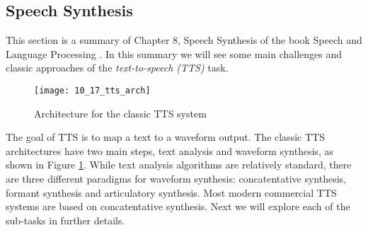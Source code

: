 \subsection{Speech Synthesis \cite{Jurafsky2006}}

This section is a summary of Chapter 8, Speech Synthesis of the book Speech and Language Processing \cite{Jurafsky2006}. In this summary we will see some main challenges and classic approaches of the \emph{text-to-speech (TTS)} task.

\begin{figure}[htbp]
  \centering
  \texttt{[image: 10\_17\_tts\_arch]}\\
  \caption{Architecture for the classic TTS system}\label{fig:TTS_arch}
\end{figure}

The goal of TTS is to map a text to a waveform output. The classic TTS architectures have two main steps, text analysis and waveform synthesis, as shown in Figure \ref{fig:TTS_arch}. While text analysis algorithms are relatively standard, there are three different paradigms for waveform synthesis: concatentative synthesis, formant synthesis and articulatory synthesis. Most modern commercial TTS systems are based on concatentative synthesis. Next we will explore each of the sub-tasks in further details.

